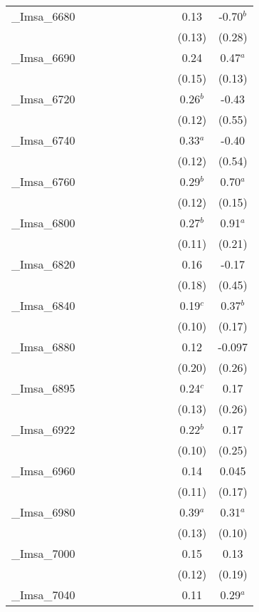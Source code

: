 \documentclass[]{article}
\begin{document}
\begin{tabular}{lcccccccccc}
\_Imsa\_6680 &  &  &  &  &  &  &  &  & 0.13 & -0.70$^b$ \\
 &  &  &  &  &  &  &  &  & (0.13) & (0.28) \\
\_Imsa\_6690 &  &  &  &  &  &  &  &  & 0.24 & 0.47$^a$ \\
 &  &  &  &  &  &  &  &  & (0.15) & (0.13) \\
\_Imsa\_6720 &  &  &  &  &  &  &  &  & 0.26$^b$ & -0.43 \\
 &  &  &  &  &  &  &  &  & (0.12) & (0.55) \\
\_Imsa\_6740 &  &  &  &  &  &  &  &  & 0.33$^a$ & -0.40 \\
 &  &  &  &  &  &  &  &  & (0.12) & (0.54) \\
\_Imsa\_6760 &  &  &  &  &  &  &  &  & 0.29$^b$ & 0.70$^a$ \\
 &  &  &  &  &  &  &  &  & (0.12) & (0.15) \\
\_Imsa\_6800 &  &  &  &  &  &  &  &  & 0.27$^b$ & 0.91$^a$ \\
 &  &  &  &  &  &  &  &  & (0.11) & (0.21) \\
\_Imsa\_6820 &  &  &  &  &  &  &  &  & 0.16 & -0.17 \\
 &  &  &  &  &  &  &  &  & (0.18) & (0.45) \\
\_Imsa\_6840 &  &  &  &  &  &  &  &  & 0.19$^c$ & 0.37$^b$ \\
 &  &  &  &  &  &  &  &  & (0.10) & (0.17) \\
\_Imsa\_6880 &  &  &  &  &  &  &  &  & 0.12 & -0.097 \\
 &  &  &  &  &  &  &  &  & (0.20) & (0.26) \\
\_Imsa\_6895 &  &  &  &  &  &  &  &  & 0.24$^c$ & 0.17 \\
 &  &  &  &  &  &  &  &  & (0.13) & (0.26) \\
\_Imsa\_6922 &  &  &  &  &  &  &  &  & 0.22$^b$ & 0.17 \\
 &  &  &  &  &  &  &  &  & (0.10) & (0.25) \\
\_Imsa\_6960 &  &  &  &  &  &  &  &  & 0.14 & 0.045 \\
 &  &  &  &  &  &  &  &  & (0.11) & (0.17) \\
\_Imsa\_6980 &  &  &  &  &  &  &  &  & 0.39$^a$ & 0.31$^a$ \\
 &  &  &  &  &  &  &  &  & (0.13) & (0.10) \\
\_Imsa\_7000 &  &  &  &  &  &  &  &  & 0.15 & 0.13 \\
 &  &  &  &  &  &  &  &  & (0.12) & (0.19) \\
\_Imsa\_7040 &  &  &  &  &  &  &  &  & 0.11 & 0.29$^a$ \\

\end{tabular}
\end{document}
